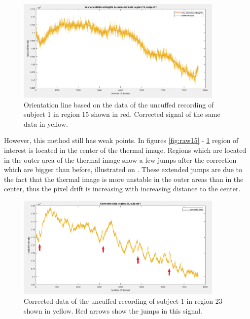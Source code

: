 \begin{figure}[H]
	\includegraphics[width=0.9\textwidth]{figures/corr15}
	\caption{Orientation line based on the data of the uncuffed recording of subject 1 in region 15 shown in red. Corrected signal of the same data in yellow.}
	\label{fig:corr15}
\end{figure}
However, this method still has weak points. In figures \ref{fig:raw15} - \ref{fig:corr15} region of interest is located in the center of the thermal image. Regions which are located in the outer area of the thermal image show a few jumps after the correction which are bigger than before, illustrated on . These extended jumps are due to the fact that the thermal image is more unstable in the outer areas than in the center, thus the pixel drift is increasing with increasing distance to the center. 
\begin{figure}[H]
	\includegraphics[width=0.9\textwidth]{figures/corr23pfeile}
	\caption{Corrected data of the uncuffed recording of subject 1 in region 23 shown in yellow. Red arrows show the jumps in this signal.}
	\label{fig:corr23}
\end{figure}
